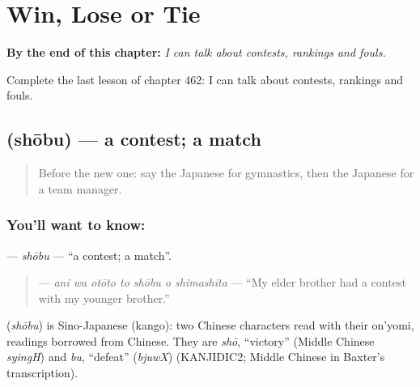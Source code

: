 
\chapter{Win, Lose or Tie}
\label{ch:ja-win-lose-or-tie}

\begin{chapteropening}
\textbf{By the end of this chapter:} \emph{I can talk about contests, rankings and fouls.}

Complete the last lesson of chapter 462: I can talk about contests, rankings and fouls.
\end{chapteropening}

\section[\texorpdfstring{\ja{しょうぶ} (shōbu)}{しょうぶ (shōbu)}]{ (shōbu) — a contest; a match}

\label{lesson:JA-C462-shoubu}



\begin{quote}
Before the new one: say the Japanese for gymnastics, then the Japanese for a team manager.
\end{quote}

\subsection*{You'll want to know: }
\textbf{} — \emph{shōbu} — \textquotedblleft{}a contest; a match\textquotedblright{}.

\begin{quote}
\textbf{   } — \emph{ani wa otōto to shōbu o shimashita} — \textquotedblleft{}My elder brother had a contest with my younger brother.\textquotedblright{}
\end{quote}

\begin{cousinweb}
\textbf{} (\emph{shōbu}) is Sino-Japanese (kango): two Chinese characters read with their on'yomi, readings borrowed from Chinese. They are \emph{shō}, \textquotedblleft{}victory\textquotedblright{} (Middle Chinese \emph{syingH}) and \emph{bu}, \textquotedblleft{}defeat\textquotedblright{} (\emph{bjuwX}) (KANJIDIC2; Middle Chinese in Baxter's transcription).
\end{cousinweb}

